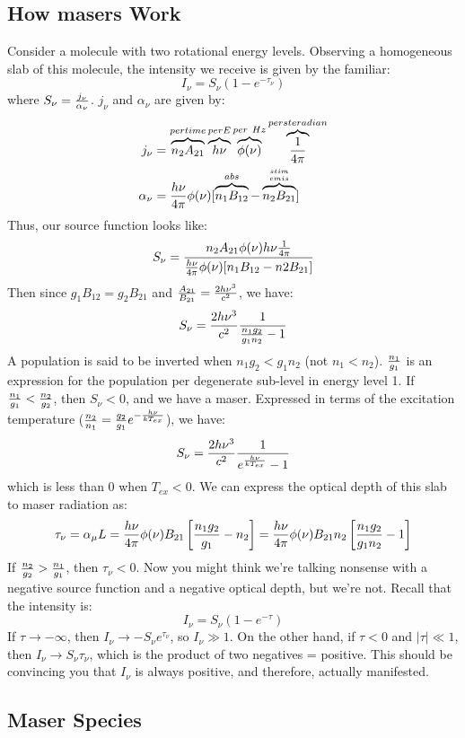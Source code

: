 \documentclass[11pt]{article}
\def\inv#1{{1 \over #1}}
\def\ato{{A_{21}}}
\def\bto{{B_{21}}}
\def\bot{{B_{12}}}
\begin{document}
\subsection*{ How masers Work }

Consider a molecule with two rotational energy levels.  Observing a homogeneous
slab of this molecule, the intensity we receive is given by the familiar:
$$I_\nu=S_\nu(1-e^{-\tau_\nu})$$
where $S_\nu={j_\nu\over\alpha_\nu}$.  $j_\nu$ and $\alpha_\nu$ are given by:
$$\begin{aligned}j_\nu&=\overbrace{n_2\ato}^{per time}\overbrace{h\nu}^{per E}
\overbrace{\phi(\nu)}^{per\ Hz}\overbrace{\inv{4\pi}}^{per steradian}\\ 
\alpha_\nu&={h\nu\over4\pi}\phi(\nu)[\overbrace{n_1\bot}^{abs}-\overbrace{
n_2\bto}^{stim\atop emis}]\\ \end{aligned}$$
Thus, our source function looks like:
$$S_\nu={n_2\ato\phi(\nu)h\nu\inv{4\pi}\over{h\nu\over4\pi}\phi(\nu)[n_1\bot-
n2\bto]}$$
Then since $g_1\bot=g_2\bto$ and ${\ato\over\bto}={2h\nu^3\over c^2}$, we have:
$$S_\nu={2h\nu^3\over c^2}\inv{{n_1g_2\over g_1n_2}-1}$$
A population is said to be inverted when $n_1g_2<g_1n_2$ (not $n_1<n_2$).
$n_1\over g_1$ is an expression for the population per degenerate sub-level in
energy level 1.  If ${n_1\over g_1}<{n_2\over g_2}$, then $S_\nu<0$, and we
have a maser.  Expressed in terms of the excitation temperature (${n_2\over n_1}
={g_2\over g_1}e^{-{h\nu\over kT_{ex}}}$), we have:
$$S_\nu={2h\nu^3\over c^2}\inv{e^{h\nu\over kT_{ex}}-1}$$
which is less than 0 when $T_{ex}<0$.  We can express the optical depth of
this slab to maser radiation as:
$$\tau_\nu=\alpha_\mu L
={h\nu\over4\pi}\phi(\nu)\bto\left[{n_1g_2\over g_1}-n_2\right]
={h\nu\over4\pi}\phi(\nu)\bto n_2\left[{n_1g_2\over g_1n_2}-1\right]$$
If ${n_2\over g_2}>{n_1\over g_1}$, then $\tau_\nu<0$.  Now you might think
we're talking nonsense with a negative source function and a negative optical
depth, but we're not.  Recall that the intensity is:
$$I_\nu=S_\nu(1-e^{-\tau})$$
If $\tau\to-\infty$, then $I_\nu\to-S_\nu e^{\tau_\nu}$, so $I_\nu\gg1$. 
On the other hand, if $\tau<0$ and $|\tau|\ll1$, then $I_\nu\to S_\nu\tau_\nu$,
which is the product of two negatives = positive.  This should be convincing
you that $I_\nu$ is always positive, and therefore, actually manifested.

\subsection*{ Maser Species }
\end{document}
